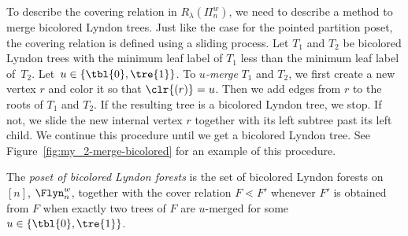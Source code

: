  To describe the covering relation in $R_\lambda(\Pi_n^w)$, we need to describe a method to merge bicolored Lyndon trees.  Just like the case for the pointed partition poset, the covering relation is defined using a sliding process.  Let $T_1$ and $T_2$ be bicolored Lyndon trees with the minimum leaf label of $T_1$ less than the minimum leaf label of~$T_2$. Let~$u\in \{\tbl{0},\tre{1}\}$. To \emph{$u$-merge} $T_1$ and $T_2$, we first create a new vertex $r$ and color it so that $\clr{(r)}=u$.  Then we add edges from $r$ to the roots of $T_1$ and $T_2$.  If the resulting tree is a bicolored Lyndon tree, we stop. If not, we slide the new internal vertex $r$ together with its left subtree past its left child. We continue this procedure until we get a bicolored Lyndon tree.  See Figure~\ref{fig:my_2-merge-bicolored} for an example of this procedure.




 \begin{defi}   The \emph{poset of bicolored Lyndon forests} is the set of bicolored Lyndon forests on $[n]$, $\Flyn_{n}^{w}$, together with the  cover relation $F\lessdot F'$   whenever $F'$ is obtained from $F$ when exactly two trees of $F$ are $u$-merged for some $u\in\left\{\tbl{0},\tre{1}\right\}$.
\end{defi}



